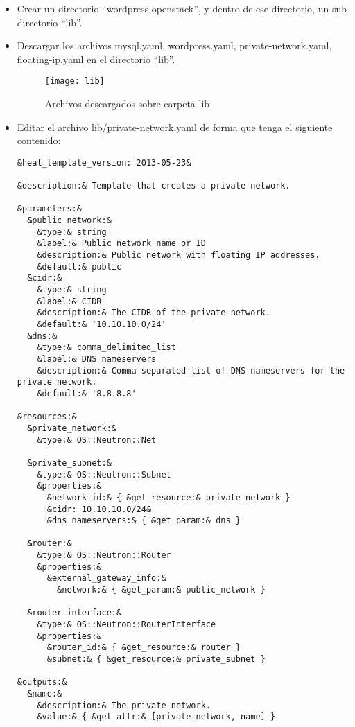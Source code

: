\documentclass[10pt]{article}   			%
\begin{document}
\begin{itemize}
	\item Crear un directorio “wordpress-openstack”, y dentro de ese directorio, un sub-directorio “lib”.
	\item Descargar los archivos mysql.yaml, wordpress.yaml, private-network.yaml, floating-ip.yaml en el directorio “lib”.
	\begin{figure}[ht] 
		\centering
			\texttt{[image: lib]}   
		\caption{Archivos descargados sobre carpeta lib} \label{fig:Librerias}
	\end{figure}

	\item Editar el archivo lib/private-network.yaml de forma que tenga el siguiente contenido:
	\begin{small}
	\begin{lstlisting}[frame=single,style=base]	
&heat_template_version: 2013-05-23&

&description:& Template that creates a private network.

&parameters:&
  &public_network:&
    &type:& string
    &label:& Public network name or ID
    &description:& Public network with floating IP addresses.
    &default:& public
  &cidr:&
    &type:& string
    &label:& CIDR
    &description:& The CIDR of the private network.
    &default:& '10.10.10.0/24'
  &dns:&
    &type:& comma_delimited_list
    &label:& DNS nameservers
    &description:& Comma separated list of DNS nameservers for the private network.
    &default:& '8.8.8.8'

&resources:&
  &private_network:&
    &type:& OS::Neutron::Net

  &private_subnet:&
    &type:& OS::Neutron::Subnet
    &properties:&
      &network_id:& { &get_resource:& private_network }
      &cidr: 10.10.10.0/24&
      &dns_nameservers:& { &get_param:& dns }

  &router:&
    &type:& OS::Neutron::Router
    &properties:&
      &external_gateway_info:&
        &network:& { &get_param:& public_network }

  &router-interface:&
    &type:& OS::Neutron::RouterInterface
    &properties:&
      &router_id:& { &get_resource:& router }
      &subnet:& { &get_resource:& private_subnet }

&outputs:&
  &name:&
    &description:& The private network.
    &value:& { &get_attr:& [private_network, name] }
	\end{lstlisting}
	\end{small}


\end{itemize}
\end{document}
